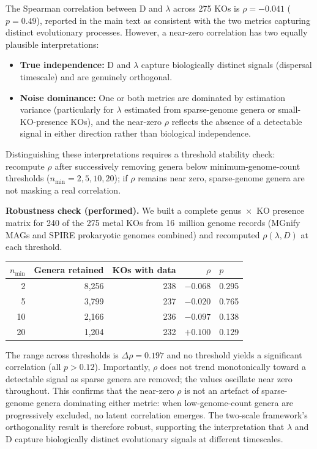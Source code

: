 \documentclass[11pt]{article}
\begin{document}
The Spearman correlation between D and $\lambda$ across 275 KOs is $\rho = -0.041$ ($p = 0.49$), reported in the main text as consistent with the two metrics capturing distinct evolutionary processes.
However, a near-zero correlation has two equally plausible interpretations:

\begin{itemize}
\item \textbf{True independence:} D and $\lambda$ capture biologically distinct signals (dispersal timescale) and are genuinely orthogonal.
\item \textbf{Noise dominance:} One or both metrics are dominated by estimation variance (particularly for $\lambda$ estimated from sparse-genome genera or small-KO-presence KOs), and the near-zero $\rho$ reflects the absence of a detectable signal in either direction rather than biological independence.
\end{itemize}

Distinguishing these interpretations requires a threshold stability check: recompute $\rho$ after successively removing genera below minimum-genome-count thresholds ($n_\text{min} = 2, 5, 10, 20$); if $\rho$ remains near zero, sparse-genome genera are not masking a real correlation.

\textbf{Robustness check (performed).}
We built a complete genus~$\times$~KO presence matrix for 240 of the 275 metal KOs from 16~million genome records (MGnify MAGs and SPIRE prokaryotic genomes combined) and recomputed $\rho(\lambda, D)$ at each threshold.

\begin{center}
\small
\begin{tabular}{rrrrl}
\toprule
$n_\text{min}$ & Genera retained & KOs with data & $\rho$ & $p$ \\
\midrule
2  & 8,256 & 238 & $-0.068$ & 0.295 \\
5  & 3,799 & 237 & $-0.020$ & 0.765 \\
10 & 2,166 & 236 & $-0.097$ & 0.138 \\
20 & 1,204 & 232 & $+0.100$ & 0.129 \\
\bottomrule
\end{tabular}
\end{center}

The range across thresholds is $\Delta\rho = 0.197$ and no threshold yields a significant correlation (all $p > 0.12$).
Importantly, $\rho$ does not trend monotonically toward a detectable signal as sparse genera are removed; the values oscillate near zero throughout.
This confirms that the near-zero $\rho$ is not an artefact of sparse-genome genera dominating either metric: when low-genome-count genera are progressively excluded, no latent correlation emerges.
The two-scale framework's orthogonality result is therefore robust, supporting the interpretation that $\lambda$ and D capture biologically distinct evolutionary signals at different timescales.
\end{document}
